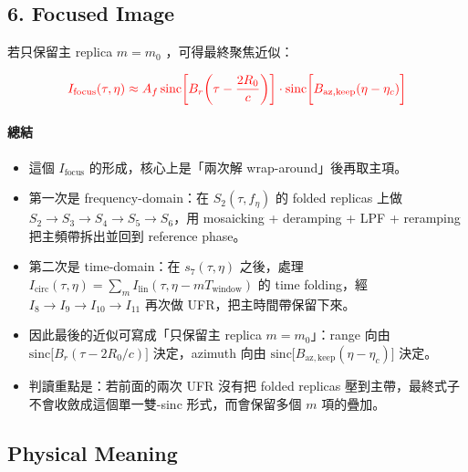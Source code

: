 \documentclass[10pt]{article}
\providecommand{\tightlist}{%
  \setlength{\itemsep}{0pt}\setlength{\parskip}{0pt}}
\begin{document}
\hypertarget{focused-image}{%
\subsection{6. Focused Image}\label{focused-image}}

若只保留主 replica \(m=m_0\) ，可得最終聚焦近似：

\begin{equation}
\begin{aligned}
{\color{red}{I_{\mathrm{focus}}(\tau,\eta) \approx A_f\,
\mathrm{sinc}\biggl[ B_r\biggl( \tau-\frac{2R_0}{c} \biggr) \biggr]\cdot
\mathrm{sinc}\biggl[ B_{\mathrm{az,keep}}(\eta-\eta_c) \biggr]}}
\end{aligned}
\end{equation}

\hypertarget{ux7e3dux7d50}{%
\paragraph{總結}\label{ux7e3dux7d50}}

\begin{itemize}
\tightlist
\item
  這個 \(I_{\mathrm{focus}}\) 的形成，核心上是「兩次解
  wrap-around」後再取主項。
\item
  第一次是 frequency-domain：在 \(S_2(\tau,f_\eta)\) 的 folded replicas
  上做
  \(S_2 \rightarrow S_3 \rightarrow S_4 \rightarrow S_5 \rightarrow S_6\)，用
  mosaicking + deramping + LPF + reramping 把主頻帶拆出並回到 reference
  phase。
\item
  第二次是 time-domain：在 \(s_7(\tau,\eta)\) 之後，處理
  \(I_{\mathrm{circ}}(\tau,\eta)=\sum_m I_{\mathrm{lin}}(\tau,\eta-mT_{\mathrm{window}})\)
  的 time folding，經
  \(I_8 \rightarrow I_9 \rightarrow I_{10} \rightarrow I_{11}\) 再次做
  UFR，把主時間帶保留下來。
\item
  因此最後的近似可寫成「只保留主 replica \(m=m_0\)」：range 向由
  \(\mathrm{sinc}\bigl[ B_r(\tau-2R_0/c) \bigr]\) 決定，azimuth 向由
  \(\mathrm{sinc}\bigl[ B_{\mathrm{az,keep}}(\eta-\eta_c) \bigr]\)
  決定。
\item
  判讀重點是：若前面的兩次 UFR 沒有把 folded replicas
  壓到主帶，最終式子不會收斂成這個單一雙-sinc 形式，而會保留多個 \(m\)
  項的疊加。
\end{itemize}

\hypertarget{physical-meaning}{%
\subsection{Physical Meaning}\label{physical-meaning}}
\end{document}
